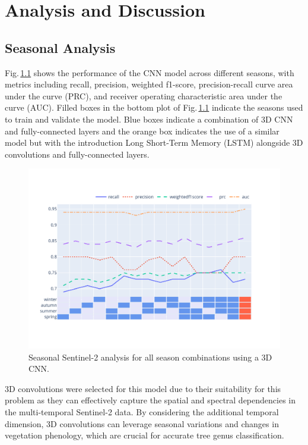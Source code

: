 \chapter{Analysis and Discussion}
\label{chapter:analysis}

\section{Seasonal Analysis}

Fig.\,\ref{fig:seasonal_selection} shows the performance of the CNN model across different seasons, with metrics including recall, precision, weighted f1-score, precision-recall curve area under the curve (PRC), and receiver operating characteristic area under the curve (AUC). Filled boxes in the bottom plot of Fig.\,\ref{fig:seasonal_selection} indicate the seasons used to train and validate the model. Blue boxes indicate a combination of 3D CNN and fully-connected layers and the orange box indicates the use of a similar model but with the introduction Long Short-Term Memory (LSTM) alongside 3D convolutions and fully-connected layers.

\begin{figure}[ht]
    \centering
    \includegraphics[width=0.9\linewidth, trim={20pt 40pt 10pt 30pt}, clip]{figures/figures_analysis/seasonal_selection.pdf}
    \caption{Seasonal Sentinel-2 analysis for all season combinations using a 3D CNN.}
    \label{fig:seasonal_selection}
\end{figure}


3D convolutions were selected for this model due to their suitability for this problem as they can effectively capture the spatial and spectral dependencies in the multi-temporal Sentinel-2 data. By considering the additional temporal dimension, 3D convolutions can leverage seasonal variations and changes in vegetation phenology, which are crucial for accurate tree genus classification.

